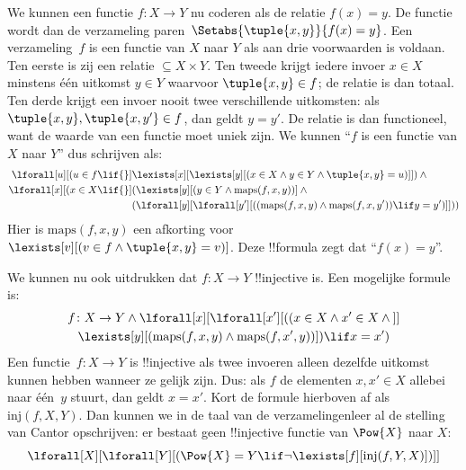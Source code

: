 \documentclass[../../../include/open-logic-section]{subfiles}
\begin{document}
We kunnen een functie $f \colon X \to Y$ nu coderen als de relatie
$f(x) = y$. De functie wordt dan de verzameling
paren~$\Setabs{\tuple{x,y}}{f(x) = y}$. Een verzameling~$f$ is een
functie van $X$ naar $Y$ als aan drie voorwaarden is voldaan. Ten eerste
is zij een relatie $\subseteq X \times Y$. Ten tweede krijgt iedere
invoer $x \in X$ minstens één uitkomst $y \in Y$ waarvoor
$\tuple{x, y} \in f$; de relatie is dan totaal. Ten derde krijgt
een invoer nooit twee verschillende uitkomsten: als $\tuple{x, y},
\tuple{x, y'} \in f$, dan geldt $y = y'$. De relatie is dan
functioneel, want de waarde van een functie moet uniek zijn. We
kunnen ``$f$ is een functie van $X$ naar $Y$'' dus schrijven als:
\begin{align*}
 \lforall[u][(u \in f \lif {}] & \lexists[x][\lexists[y][(x \in X \land y \in
      Y \land \tuple{x, y} = u)]]) \land {}\\
 \lforall[x][(x \in X \lif {}] &
      (\lexists[y][(y \in Y \land \mathrm{maps}(f, x, y))] \land {}\\
& (\lforall[y][\lforall[y'][((\mathrm{maps}(f, x, y) \land
    \mathrm{maps}(f, x, y')) \lif y = y')]]))
\end{align*}
Hier is $\mathrm{maps}(f, x, y)$ een afkorting voor
$\lexists[v][(v \in f \land \tuple{x, y} = v)]$. Deze !!{formula}
zegt dat ``$f(x) = y$''.

We kunnen nu ook uitdrukken dat $f\colon X \to Y$ !!{injective} is.
Een mogelijke formule is:
\begin{multline*}
 f \colon X \to Y \land \lforall[x][\lforall[x'][((x \in X \land x' \in
     X \land {}]] \\
 \lexists[y][(\mathrm{maps}(f, x, y) \land \mathrm{maps}(f,
        x', y))]) \lif x = x')
\end{multline*}
Een functie~$f\colon X \to Y$ is !!{injective} als twee invoeren alleen
dezelfde uitkomst kunnen hebben wanneer ze gelijk zijn. Dus: als $f$
de elementen $x, x' \in X$ allebei naar één~$y$ stuurt, dan geldt $x =
x'$. Kort de formule hierboven af als $\mathrm{inj}(f, X, Y)$. Dan
kunnen we in de taal van de verzamelingenleer al de stelling van Cantor
opschrijven: er bestaat geen !!{injective} functie van $\Pow{X}$ naar
$X$:
\[
\lforall[X][\lforall[Y][(\Pow{X} = Y \lif
    \lnot\lexists[f][\mathrm{inj}(f, Y, X)])]]
\]
\end{document}
